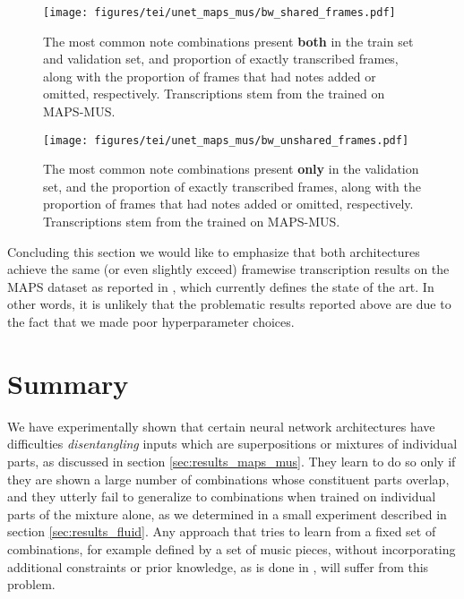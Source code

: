 \begin{figure}[ht]
  \centering
  \texttt{[image: figures/tei/unet\_maps\_mus/bw\_shared\_frames.pdf]}
  \caption{The most common note combinations present \textbf{both} in the train set and validation set, and proportion of exactly transcribed frames, along with the proportion of frames that had notes added or omitted, respectively. Transcriptions stem from the \AUNet trained on MAPS-MUS. \label{fig:unet-maps-mus-shared}}
\end{figure}

\begin{figure}[ht!]
  \centering
  \texttt{[image: figures/tei/unet\_maps\_mus/bw\_unshared\_frames.pdf]}
  \caption{The most common note combinations present \textbf{only} in the validation set, and the proportion of exactly transcribed frames, along with the proportion of frames that had notes added or omitted, respectively. Transcriptions stem from the \AUNet trained on \mbox{MAPS-MUS}. \label{fig:unet-maps-mus-unshared}}
\end{figure}

Concluding this section we would like to emphasize that both architectures achieve the same (or even slightly exceed) framewise transcription results on the MAPS dataset as reported in \cite{Kelz_Dorfer_Korzeniowski_Boeck_Arzt_Widmer_2016}, which currently defines the state of the art. In other words, it is unlikely that the problematic results reported above are due to the fact that we made poor hyperparameter choices.

\section{Summary} 
We have experimentally shown that certain neural network architectures have difficulties \textit{disentangling} inputs which are superpositions or mixtures of individual parts, as discussed in section \ref{sec:results_maps_mus}. They learn to do so only if they are shown a large number of combinations whose constituent parts overlap, and they utterly fail to generalize to combinations when trained on individual parts of the mixture alone, as we determined in a small experiment described in section \ref{sec:results_fluid}. Any approach that tries to learn from a fixed set of combinations, for example defined by a set of music pieces, without incorporating additional constraints or prior knowledge, as is done in \cite{Sigtia_Benetos_Boulanger_Weyde_Avila_Dixon_2015, Sigtia_Benetos_Dixon_2016, Kelz_Dorfer_Korzeniowski_Boeck_Arzt_Widmer_2016}, will suffer from this problem.

